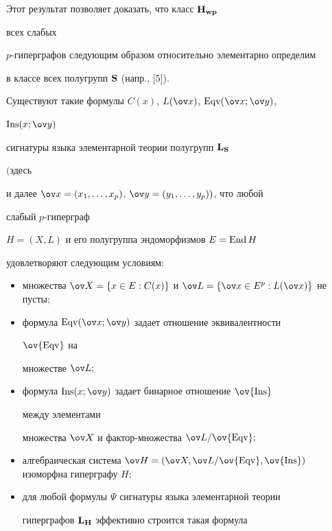  


Этот результат позволяет доказать, что класс $\bold H_{\bold w\bold p}$ 


всех слабых 


$p$-гиперграфов следующим образом относительно элементарно определим 


в классе всех полугрупп $\bold S$ (напр., [5]). 


 


\begin{thm} 


Существуют такие формулы $C(x)$, $L(\ov x)$, $\Eqv(\ov x;\ov y)$, 


$\Ins(x;\ov y)$ 


сигнатуры языка элементарной теории полугрупп $\bold L_{\bold S}$ 


$($здесь 


и далее $\ov x=(x_1,\dotsc,x_p)$, $\ov y=(y_1,\dotsc,y_p))$, что любой 


слабый $p$-гиперграф 


$H=(X,L)$ и его полугруппа эндоморфизмов $E=\operatorname{End} H$ 


удовлетворяют следующим условиям$:$ 


\begin{itemize} 


\item[1)] множества $\ov X=\{x\in E:C(x)\}$ и $\ov L=\{\ov x\in 


E^p:L(\ov x)\}$ не пусты$;$ 


\item[2)] формула $\Eqv(\ov x;\ov y)$ задает отношение эквивалентности 


$\ov{\Eqv}$ на 


множестве $\ov L;$ 


\item[3)] формула $\Ins(x;\ov y)$ задает бинарное отношение $\ov{\Ins}$ 


между элементами 


множества $\ov X$ и фактор-множества $\ov L/\ov{\Eqv};$ 


\item[4)] алгебраическая система $\ov H=(\ov X,\ov 


L/\ov{\Eqv},\ov{\Ins})$ изоморфна гиперграфу $H;$ 


\item[5)] для любой формулы $\Psi$ сигнатуры языка элементарной теории 


гиперграфов $\bold L_{\bold H}$ эффективно строится такая формула 



\end{itemize}
\end{thm}
